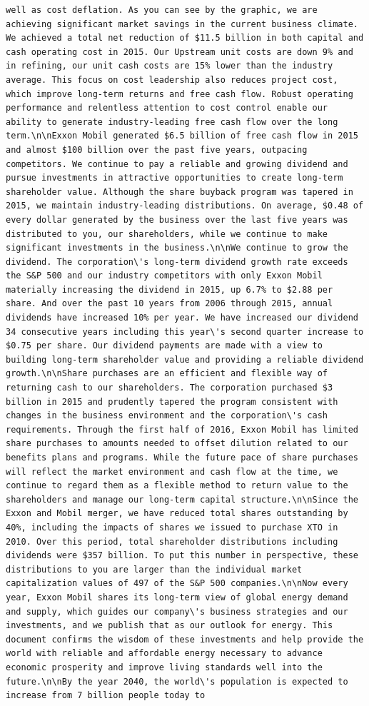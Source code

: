 \documentclass[
  letterpaper,
  DIV=11,
  numbers=noendperiod]{scrreprt}
\begin{document}
\begin{verbatim}
well as cost deflation. As you can see by the graphic, we are achieving significant market savings in the current business climate. We achieved a total net reduction of $11.5 billion in both capital and cash operating cost in 2015. Our Upstream unit costs are down 9% and in refining, our unit cash costs are 15% lower than the industry average. This focus on cost leadership also reduces project cost, which improve long-term returns and free cash flow. Robust operating performance and relentless attention to cost control enable our ability to generate industry-leading free cash flow over the long term.\n\nExxon Mobil generated $6.5 billion of free cash flow in 2015 and almost $100 billion over the past five years, outpacing competitors. We continue to pay a reliable and growing dividend and pursue investments in attractive opportunities to create long-term shareholder value. Although the share buyback program was tapered in 2015, we maintain industry-leading distributions. On average, $0.48 of every dollar generated by the business over the last five years was distributed to you, our shareholders, while we continue to make significant investments in the business.\n\nWe continue to grow the dividend. The corporation\'s long-term dividend growth rate exceeds the S&P 500 and our industry competitors with only Exxon Mobil materially increasing the dividend in 2015, up 6.7% to $2.88 per share. And over the past 10 years from 2006 through 2015, annual dividends have increased 10% per year. We have increased our dividend 34 consecutive years including this year\'s second quarter increase to $0.75 per share. Our dividend payments are made with a view to building long-term shareholder value and providing a reliable dividend growth.\n\nShare purchases are an efficient and flexible way of returning cash to our shareholders. The corporation purchased $3 billion in 2015 and prudently tapered the program consistent with changes in the business environment and the corporation\'s cash requirements. Through the first half of 2016, Exxon Mobil has limited share purchases to amounts needed to offset dilution related to our benefits plans and programs. While the future pace of share purchases will reflect the market environment and cash flow at the time, we continue to regard them as a flexible method to return value to the shareholders and manage our long-term capital structure.\n\nSince the Exxon and Mobil merger, we have reduced total shares outstanding by 40%, including the impacts of shares we issued to purchase XTO in 2010. Over this period, total shareholder distributions including dividends were $357 billion. To put this number in perspective, these distributions to you are larger than the individual market capitalization values of 497 of the S&P 500 companies.\n\nNow every year, Exxon Mobil shares its long-term view of global energy demand and supply, which guides our company\'s business strategies and our investments, and we publish that as our outlook for energy. This document confirms the wisdom of these investments and help provide the world with reliable and affordable energy necessary to advance economic prosperity and improve living standards well into the future.\n\nBy the year 2040, the world\'s population is expected to increase from 7 billion people today to 
\end{verbatim}
\end{document}
